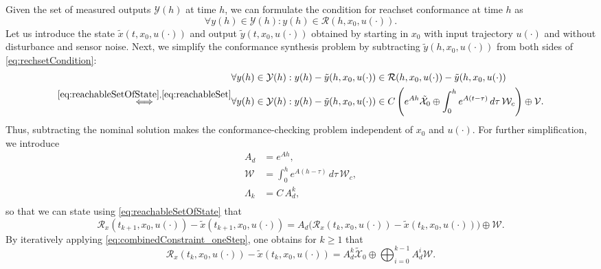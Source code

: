 \documentclass[EPiC]{easychair}
\renewcommand{\^}[1]{^{(#1)}}
\begin{document}
Given the set of measured outputs $\mathcal{Y}(h)$ at time $h$, we can formulate the condition for reachset conformance at time $h$ as
\begin{equation}
     \label{eq:rechsetCondition}
	 \forall y(h) \in \mathcal{Y}(h): y(h) \in \mathcal{R}(h,x_0,u(\cdot)).
\end{equation}
Let us introduce the state $\tilde{x}(t,x_0,u(\cdot))$ and output $\tilde{y}(t,x_0,u(\cdot))$ obtained by starting in $x_0$ with input trajectory $u(\cdot)$ and without disturbance and sensor noise. Next, we simplify the conformance synthesis problem by subtracting $\tilde{y}(h,x_0,u(\cdot))$ from both sides of \eqref{eq:rechsetCondition}:
\begin{equation}
\begin{split}
     \label{eq:modeling:stricterConstraint}
	 & \forall y(h) \in \mathcal{Y}(h): y(h) - \tilde{y}(h,x_0,u(\cdot)) \in \mathcal{R}(h,x_0,u(\cdot)) - \tilde{y}(h,x_0,u(\cdot)) \\
	 \overset{\eqref{eq:reachableSetOfState},\eqref{eq:reachableSet}}{\Longleftrightarrow} & \forall y(h) \in \mathcal{Y}(h): y(h) - \tilde{y}(h,x_0,u(\cdot)) \in C \left(e^{Ah} \tilde{\mathcal{X}}_0  \oplus \int_{0}^{h}e^{A(t-\tau)}  \, d\tau \, \mathcal{W}_c \right) \oplus \mathcal{V}.
\end{split}
\end{equation}
Thus, subtracting the nominal solution makes the conformance-checking problem independent of $x_0$ and $u(\cdot)$. For further simplification, we introduce
\begin{equation*}
 \begin{split}
  A_d &= e^{A h}, \\
  \mathcal{W} &= \int_{0}^{h}e^{A(h-\tau)} \, d\tau \, \mathcal{W}_c, \\
  \Lambda_k &= C \, A_d^k, \\
 \end{split}
\end{equation*}
so that we can state using \eqref{eq:reachableSetOfState} that
\begin{equation}
    \label{eq:combinedConstraint_oneStep}
	\mathcal{R}_x(t_{k+1},x_0,u(\cdot)) - \tilde{x}(t_{k+1},x_0,u(\cdot)) =  A_d \big(\mathcal{R}_x(t_{k},x_0,u(\cdot)) - \tilde{x}(t_k,x_0,u(\cdot))\big) \oplus \mathcal{W}. 
\end{equation}
By iteratively applying \eqref{eq:combinedConstraint_oneStep}, one obtains for $k \geq 1$ that
\begin{equation*}
	\mathcal{R}_x(t_{k},x_0,u(\cdot)) - \tilde{x}(t_k,x_0,u(\cdot)) =  A_d^k \tilde{\mathcal{X}}_0 \oplus \bigoplus_{i=0}^{k-1} A_d^i \mathcal{W}. 
\end{equation*}
\end{document}

